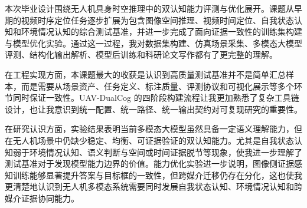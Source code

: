 
\begin{designsummary}
本次毕业设计围绕无人机具身时空推理中的双认知能力评测与优化展开。课题从早期的视频时序定位任务逐步扩展为包含图像空间推理、视频时间定位、自我状态认知和环境情况认知的综合测试基准，并进一步完成了面向证据一致性的训练集构建与模型优化实验。通过这一过程，我对数据集构建、仿真场景采集、多模态大模型评测、结构化输出解析、模型后训练和科研论文写作都有了更完整的理解。

在工程实现方面，本课题最大的收获是认识到高质量测试基准并不是简单汇总样本，而是需要从场景资产、任务定义、标注质量、评测协议和可视化展示等多个环节同时保证一致性。UAV-DualCog 的四阶段构建流程让我更加熟悉了复杂工具链设计，也让我意识到统一配置、统一路径、统一输出契约对可复现研究的重要性。

在研究认识方面，实验结果表明当前多模态大模型虽然具备一定语义理解能力，但在无人机场景中仍缺少稳定、均衡、可证据验证的双认知能力。尤其是自我状态认知弱于环境情况认知、语义判断与空间或时间证据脱节等现象，使我进一步理解了测试基准对于发现模型能力边界的价值。能力优化实验进一步说明，图像侧证据感知训练能够显著提升答案与目标框的一致性，但跨媒介迁移仍存在分化，这也使我更清楚地认识到无人机多模态系统需要同时发展自我状态认知、环境情况认知和跨媒介证据协同能力。
\end{designsummary}
